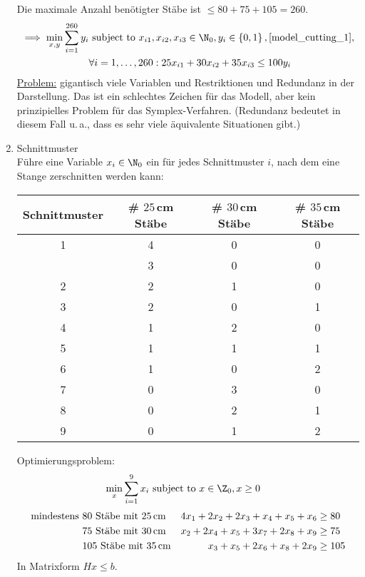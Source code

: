 \begin{beispiel}[Zuschnittsoptimierung]
\begin{enumerate}[label={Variante \arabic*.}]
      Die maximale Anzahl benötigter Stäbe ist $\leq 80 + 75 +105 = 260$.
      \begin{align*}
        \implies \min_{x,y}\sum_{i=1}^{260} y_{i} &\text{ subject to } x_{i1},x_{i2},x_{i3} \in \N_{0}, y_{i}\in \left\{0,1 \right\} , \eqref{model_cutting_1},\\
                                                  & \forall i = 1,\dots ,260 : 25x_{i1} + 30x_{i2} + 35x_{i3} \leq 100y_{i}
      \end{align*}
      \underline{Problem:} gigantisch viele Variablen und Restriktionen und Redundanz in der Darstellung. Das ist ein schlechtes Zeichen für das Modell, aber kein prinzipielles Problem für das Symplex-Verfahren. (Redundanz bedeutet in diesem Fall u.\,a., dass es sehr viele äquivalente Situationen gibt.)
    \item \label{item:Zuschnittbettermodel} Schnittmuster\\
     	Führe eine Variable $x_{i} \in \N_{0}$ ein für jedes Schnittmuster $i$, nach dem eine Stange zerschnitten werden kann:
      \begin{table}[H]
        \centering
        \begin{tabular}{c|c|c|c}
          Schnittmuster & \# $25\,$cm Stäbe & \# $30\,$cm Stäbe & \# $35\,$cm Stäbe\\
          \hline
          1 & 4 & 0 & 0\\
            & 3 & 0 & 0\\
          2 & 2 & 1 & 0\\
          3 & 2 & 0 & 1\\
          4 & 1 & 2 & 0\\
          5 & 1 & 1 & 1\\
          6 & 1 & 0 & 2\\
          7 & 0 & 3 & 0\\
          8 & 0 & 2 & 1\\
          9 & 0 & 1 & 2\\
        \end{tabular}
		\end{table}

    Optimierungsproblem:
    \begin{align*}
      \min_{x} \sum_{i=1}^{9} x_{i}& \text{ subject to } x \in \Z_{0}, x\geq 0
    \end{align*}
    \begin{align*}
      \text{mindestens } &80 \text{ Stäbe mit $25$\,cm}& 4x_{1} + 2x_{2} + 2x_{3} + x_{4} + x_{5} + x_{6} &\geq 80\\
                         &75\text{ Stäbe mit $30$\,cm}& x_{2} + 2x_{4} + x_{5} + 3x_{7} + 2x_{8} + x_{9} &\geq 75\\
                         &105\text{ Stäbe mit $35$\,cm}& x_{3} + x_{5} + 2x_{6} + x_{8} + 2x_{9} &\geq 105
    	\end{align*}
		In Matrixform $Hx \leq b$.


\end{enumerate}
\end{beispiel}
